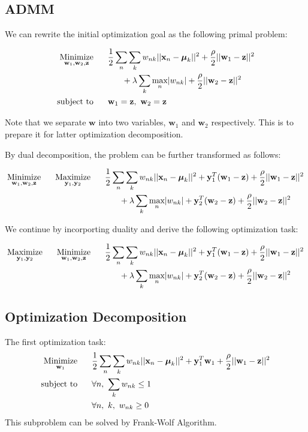 \documentclass{article} %
\newcommand{\LTwoNorm}[1]{||#1||^{2}}
\newcommand{\sumn}{\sum_{n}}
\newcommand{\sumk}{\sum_{k}}
\newcommand{\wnk}{w_{nk}}
\newcommand{\wone}{\mathbf{w}_1}
\newcommand{\wtwo}{\mathbf{w}_2}
\newcommand{\w}{\mathbf{w}}
\newcommand{\xn}{\mathbf{x}_n}
\newcommand{\muk}{\boldsymbol{\mu}_k}
\newcommand{\maxn}{ \underset{n}{\text{max}} }
\newcommand{\yone}{\mathbf{y}_1}
\newcommand{\ytwo}{\mathbf{y}_2}
\newcommand{\z}{\mathbf{z}}
\newcommand{\quadraterm}[1]{\frac{\rho}{2}\LTwoNorm{\w_{#1}-\z}}
\newcommand{\dualterm}[1]{\mathbf{y}_{#1}^{T}(\w_{#1}-\z)}
\newcommand{\minimize}[1]{ \underset{#1}{\text{Minimize}} }
\newcommand{\maximize}[1]{ \underset{#1}{\text{Maximize}} }
\newcommand{\subjectto}{ \text{subject to} }
\newcommand{\hs}{\hspace*{0.6cm}}
\begin{document}
\subsection{ADMM}

We can rewrite the initial optimization goal as the following primal problem: 

 \begin{align}
  \minimize{\wone, \wtwo, \z} 
  \hs & \frac{1}{2} \sumn \sumk \wnk \LTwoNorm{\xn - \muk}  %
    + \quadraterm{1} \nonumber \\
    & \hs + \lambda \sumk \maxn | \wnk |  
    + \quadraterm{2}
        \\ %
  \subjectto  
  \hs & \w_{1} = \z,\ \w_{2} = \z
 \end{align}

 Note that we separate $\w$ into two variables, $\wone$ and $\wtwo$
 respectively. This is to prepare it for latter optimization decomposition.

By dual decomposition, the problem can be further transformed as follows:
 
 \begin{align}
     \minimize{\wone, \wtwo, \z} \hs  \maximize{\yone, \ytwo}
   \hs & \frac{1}{2} \sumn \sumk \wnk \LTwoNorm{\xn - \muk}  %
   + \dualterm{1} + \quadraterm{1} \nonumber \\
    & \hs + \lambda \sumk \maxn | \wnk |  %
   + \dualterm{2} + \quadraterm{2}
 \end{align} 

 We continue by incorporting duality and derive the following optimization
 task:

  \begin{align}
     \maximize{\yone, \ytwo} \hs  \minimize{\wone, \wtwo, \z}
   \hs & \frac{1}{2} \sumn \sumk \wnk \LTwoNorm{\xn - \muk}  %
   + \dualterm{1} + \quadraterm{1} \nonumber \\
    & \hs + \lambda \sumk \maxn | \wnk |  %
   + \dualterm{2} + \quadraterm{2}
 \end{align} 

\subsection{Optimization Decomposition}
\newcommand{\mutw}[1]{\mathbf{y}_{#1}^{T} \w_{#1}}

The first optimization task:
  \begin{align}
   \minimize{\wone}
   \hs & \frac{1}{2} \sumn \sumk \wnk \LTwoNorm{\xn - \muk}  %
   + \mutw{1} + \quadraterm{1} \\
   \subjectto  
   \hs & \forall n,\ \sumk \wnk \leq 1 \\
   \hs & \forall n,\ k,\ \wnk \geq 0
 \end{align} 
 This subproblem can be solved by Frank-Wolf Algorithm.
\end{document}
